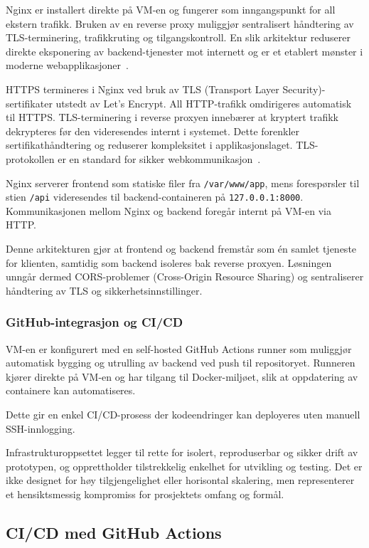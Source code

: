 Nginx er installert direkte på VM-en og fungerer som inngangspunkt for
all ekstern trafikk. Bruken av en reverse proxy muliggjør sentralisert håndtering av
TLS-terminering, trafikkruting og tilgangskontroll.
En slik arkitektur reduserer direkte eksponering av backend-tjenester
mot internett og er et etablert mønster i moderne webapplikasjoner~\cite{cloudflare-reverse-proxy}.

HTTPS termineres i Nginx ved bruk av TLS (Transport Layer Security)-sertifikater
utstedt av Let's Encrypt. All HTTP-trafikk omdirigeres automatisk til HTTPS. TLS-terminering i reverse proxyen innebærer at kryptert trafikk
dekrypteres før den videresendes internt i systemet. Dette forenkler
sertifikathåndtering og reduserer kompleksitet i applikasjonslaget.
TLS-protokollen er en standard for sikker webkommunikasjon~\cite{rfc8446}.

Nginx serverer frontend som statiske filer fra
\texttt{/var/www/app}, mens forespørsler til stien \texttt{/api}
videresendes til backend-containeren på \texttt{127.0.0.1:8000}.
Kommunikasjonen mellom Nginx og backend foregår internt på VM-en via HTTP.

Denne arkitekturen gjør at frontend og backend fremstår som én samlet
tjeneste for klienten, samtidig som backend isoleres bak reverse proxyen.
Løsningen unngår dermed CORS-problemer (Cross-Origin Resource Sharing) og sentraliserer
håndtering av TLS og sikkerhetsinnstillinger.

\subsubsection{GitHub-integrasjon og CI/CD}

VM-en er konfigurert med en self-hosted GitHub Actions runner som muliggjør
automatisk bygging og utrulling av backend ved push til repositoryet.
Runneren kjører direkte på VM-en og har tilgang til Docker-miljøet,
slik at oppdatering av containere kan automatiseres.

Dette gir en enkel CI/CD-prosess der kodeendringer kan deployeres uten
manuell SSH-innlogging.

Infrastrukturoppsettet legger til rette for isolert, reproduserbar og sikker
drift av prototypen, og opprettholder tilstrekkelig enkelhet for utvikling og
testing. Det er ikke designet for høy tilgjengelighet eller horisontal
skalering, men representerer et hensiktsmessig kompromiss for prosjektets
omfang og formål.

\subsection{CI/CD med GitHub Actions}

